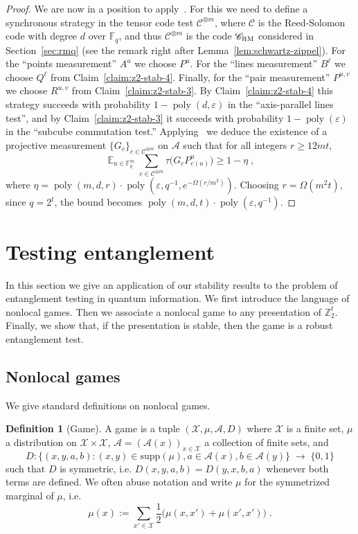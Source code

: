 \documentclass[11pt]{article}
\theoremstyle{definition}
\newtheorem{definition}[theorem]{Definition}
\newcommand{\code}{\mathscr{C}}
\DeclareMathOperator*{\Expectation}{\mathbb{E}}
\newcommand{\Es}[1]{\Expectation_{#1}}
\newcommand{\F}{\ensuremath{\mathbb{F}}}
\newcommand{\Z}{\ensuremath{\mathbb{Z}}}
\newcommand{\mA}{\ensuremath{\mathcal{A}}}
\newcommand{\mX}{\ensuremath{\mathcal{X}}}
\newcommand{\RM}{\ensuremath{\textsc{RM}}}
\DeclareMathOperator{\poly}{poly}
\newcommand{\eps}{\varepsilon}
\begin{document}
\begin{proof}
We are now in a position to apply~\cite[Theorem 4.1]{ji2022quantum}. For this we need to define a synchronous strategy in the tensor code test $\code^{\otimes m}$, where $\code$ is the Reed-Solomon code with degree $d$ over $\F_q$, and thus $\code^{\otimes m}$ is the code $\code_\RM$ considered in Section~\ref{sec:rmq} (see the remark right after Lemma~\ref{lem:schwartz-zippel}). For the ``points measurement'' $A^u$ we choose $P^u$. For the ``lines measurement'' $B^\ell$ we choose $Q^\ell$ from Claim~\ref{claim:z2-stab-4}. Finally, for the ``pair measurement'' $P^{u,v}$ we choose $R^{u,v}$ from Claim~\ref{claim:z2-stab-3}. By Claim~\ref{claim:z2-stab-4} this strategy succeeds with probability $1-\poly(d,\eps)$ in the ``axis-parallel lines test'', and by Claim~\ref{claim:z2-stab-3} it succeeds with probability $1-\poly(\eps)$ in the ``subcube commutation test.'' Applying~\cite[Theorem 4.1]{ji2022quantum} we deduce the existence of a projective measurement $\{G_c\}_{c\in\code^{\otimes m}}$ on $\mA$ such that for all integers $r \geq 12mt$,
\[ \Es{u\in\F_q^m} \sum_{c\in\code^{\otimes m}} \tau\big( G_c P^u_{c(u)}\big) \geq 1-\eta\;,\]
where $\eta = \poly(m,d,r) \cdot\poly(\eps,q^{-1},e^{-\Omega(r/m^2)})$. Choosing $r=\Omega(m^2 t)$, since $q=2^{t}$, the bound becomes $\poly(m,d,t) \cdot\poly(\eps,q^{-1})$.

\end{proof}


\section{Testing entanglement}
\label{sec:quantum}

In this section we give an application of our stability results to the problem of entanglement testing in quantum information. We first introduce the language of nonlocal games. Then we associate a nonlocal game to any presentation of $\Z_2^t$. Finally, we show that, if the presentation is stable, then the game is a robust  entanglement test. 
	
\subsection{Nonlocal games}
\label{sec:nl-games}

We give standard definitions on nonlocal games. 

\begin{definition}[Game]
A game is a tuple $(\mX,\mu,\mA,D)$ where $\mX$ is a finite set, $\mu$ a distribution on $\mX\times \mX$, $\mA=(\mA(x))_{x\in\mX}$ a collection of finite sets, and 
\[ D: \big\{ (x,y,a,b) : (x,y)\in\text{supp}(\mu),a\in\mA(x),b\in\mA(y)\big\} \;\to\;\{0,1\}\]
such that $D$ is symmetric, i.e. $D(x,y,a,b)=D(y,x,b,a)$ whenever both terms are defined. We often abuse notation and write $\mu$ for the symmetrized marginal of $\mu$, i.e.\ 
\[\mu(x) := \sum_{x'\in \mX} \frac{1}{2}\big(\mu(x,x')+\mu(x',x')\big)\;.\]
\end{definition}
\end{document}
